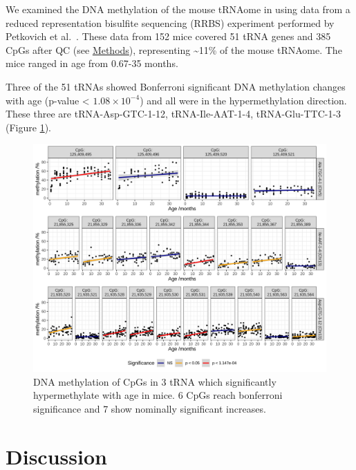 \documentclass[
]{book}
\begin{document}
We examined the DNA methylation of the mouse tRNAome in using data from a reduced representation bisulfite sequencing (RRBS) experiment performed by Petkovich et al.~\citep{Petkovich2017}.
These data from 152 mice covered 51 tRNA genes and 385 CpGs after QC (see \protect\hyperlink{mousemethods}{Methods}), representing \textasciitilde11\% of the mouse tRNAome.
The mice ranged in age from 0.67-35 months.

Three of the 51 tRNAs showed Bonferroni significant DNA methylation changes with age (p-value \textless{} \(1.08 \times 10^{-4}\)) and all were in the hypermethylation direction.
These three are tRNA-Asp-GTC-1-12, tRNA-Ile-AAT-1-4, tRNA-Glu-TTC-1-3 (Figure \ref{fig:mouse}).

\begin{figure}

{\centering \includegraphics[width=1\linewidth]{./figs/CpGPlotComb} 

}

\caption{DNA methylation of CpGs in 3 tRNA which significantly hypermethylate with age in mice. 6 CpGs reach bonferroni significance and 7 show nominally significant increases.}\label{fig:mouse}
\end{figure}



\newpage

\hypertarget{discussion-2}{%
\section{Discussion}\label{discussion-2}}
\end{document}
